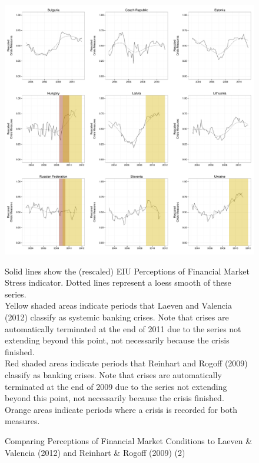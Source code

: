 \documentclass[]{article}
\begin{document}
\begin{figure}
    \caption{Comparing Perceptions of Financial Market Conditions to Laeven \& Valencia (2012) and Reinhart \& Rogoff (2009) (2)}
    \label{compare_2}
    \begin{center}
        \includegraphics[scale=0.4]{analysis/figures/compare_to_lv_rr_2.pdf}
    \end{center}

    {\tiny{Solid lines show the (rescaled) EIU Perceptions of Financial Market Stress indicator. Dotted lines represent a loess smooth of these series. \\

    Yellow shaded areas indicate periods that Laeven and Valencia (2012) classify as systemic banking crises. Note that crises are automatically terminated at the end of 2011 due to the series not extending beyond this point, not necessarily because the crisis finished. \\

    Red shaded areas indicate periods that Reinhart and Rogoff (2009) classify as banking crises. Note that crises are automatically terminated at the end of 2009 due to the series not extending beyond this point, not necessarily because the crisis finished. \\

    Orange areas indicate periods where a crisis is recorded for both measures.}}
\end{figure}
\end{document}

